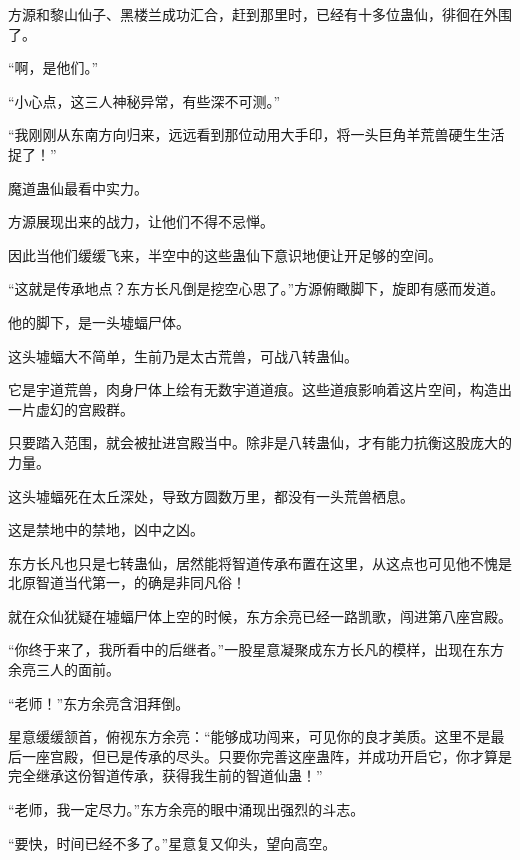 \begin{this_body}
方源和黎山仙子、黑楼兰成功汇合，赶到那里时，已经有十多位蛊仙，徘徊在外围了。

“啊，是他们。”

“小心点，这三人神秘异常，有些深不可测。”

“我刚刚从东南方向归来，远远看到那位动用大手印，将一头巨角羊荒兽硬生生活捉了！”

魔道蛊仙最看中实力。

方源展现出来的战力，让他们不得不忌惮。

因此当他们缓缓飞来，半空中的这些蛊仙下意识地便让开足够的空间。

“这就是传承地点？东方长凡倒是挖空心思了。”方源俯瞰脚下，旋即有感而发道。

他的脚下，是一头墟蝠尸体。

这头墟蝠大不简单，生前乃是太古荒兽，可战八转蛊仙。

它是宇道荒兽，肉身尸体上绘有无数宇道道痕。这些道痕影响着这片空间，构造出一片虚幻的宫殿群。

只要踏入范围，就会被扯进宫殿当中。除非是八转蛊仙，才有能力抗衡这股庞大的力量。

这头墟蝠死在太丘深处，导致方圆数万里，都没有一头荒兽栖息。

这是禁地中的禁地，凶中之凶。

东方长凡也只是七转蛊仙，居然能将智道传承布置在这里，从这点也可见他不愧是北原智道当代第一，的确是非同凡俗！

就在众仙犹疑在墟蝠尸体上空的时候，东方余亮已经一路凯歌，闯进第八座宫殿。

“你终于来了，我所看中的后继者。”一股星意凝聚成东方长凡的模样，出现在东方余亮三人的面前。

“老师！”东方余亮含泪拜倒。

星意缓缓颔首，俯视东方余亮：“能够成功闯来，可见你的良才美质。这里不是最后一座宫殿，但已是传承的尽头。只要你完善这座蛊阵，并成功开启它，你才算是完全继承这份智道传承，获得我生前的智道仙蛊！”

“老师，我一定尽力。”东方余亮的眼中涌现出强烈的斗志。

“要快，时间已经不多了。”星意复又仰头，望向高空。

\end{this_body}


